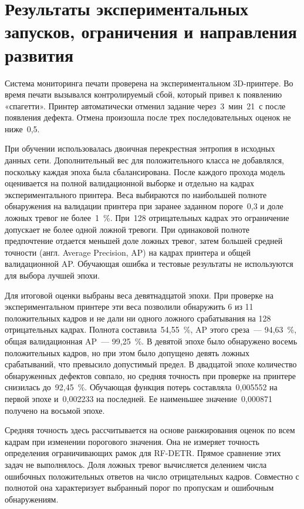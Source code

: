 \section{Результаты экспериментальных запусков, ограничения и направления развития}
\label{sec:experimental-results}

Система мониторинга печати проверена на экспериментальном 3D-принтере. Во время печати вызывался контролируемый сбой, который привел к появлению «спагетти». Принтер автоматически отменил задание через~3~мин~21~с после появления дефекта. Отмена произошла после трех последовательных оценок не ниже~0,5.

При обучении использовалась двоичная перекрестная энтропия в исходных данных сети. Дополнительный вес для положительного класса не добавлялся, поскольку каждая эпоха была сбалансирована. После каждого прохода модель оценивается на полной валидационной выборке и отдельно на кадрах экспериментального принтера. Веса выбираются по наибольшей полноте обнаружения на валидации принтера при заранее заданном пороге~0,3 и доле ложных тревог не более~1~\%. При~128 отрицательных кадрах это ограничение допускает не более одной ложной тревоги. При одинаковой полноте предпочтение отдается меньшей доле ложных тревог, затем большей средней точности (англ. Average Precision, AP) на кадрах принтера и общей валидационной AP. Обучающая ошибка и тестовые результаты не используются для выбора лучшей эпохи.

Для итоговой оценки выбраны веса девятнадцатой эпохи. При проверке на экспериментальном принтере эти веса позволили обнаружить 6 из 11 положительных кадров и не дали ни одного ложного срабатывания на 128 отрицательных кадрах.  Полнота составила~54,55~\%, AP этого среза~--- 94,63~\%, общая валидационная AP~--- 99,25~\%. В девятой эпохе было обнаружено восемь положительных кадров, но при этом было допущено девять ложных срабатываний, что превысило допустимый предел. В двадцатой эпохе количество обнаруженных дефектов совпало, но средняя точность при проверке на принтере снизилась до~92,45~\%. Обучающая функция потерь составляла~0,005552 на первой эпохе и~0,002233 на последней. Ее наименьшее значение~0,000871 получено на восьмой эпохе.

Средняя точность здесь рассчитывается на основе ранжирования оценок по всем кадрам при изменении порогового значения. Она не измеряет точность определения ограничивающих рамок для RF-DETR. Прямое сравнение этих задач не выполнялось. Доля ложных тревог вычисляется делением числа ошибочных положительных ответов на число отрицательных кадров. Совместно с полнотой она характеризует выбранный порог по пропускам и ошибочным обнаружениям.

